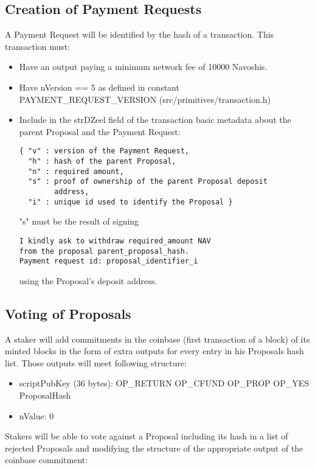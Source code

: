 \documentclass{artikel1}
\begin{document}
\begin{flushleft}
\subsection{Creation of Payment Requests}

A Payment Request will be identified by the hash of a transaction. This transaction must:

\begin{itemize}
\item Have an output paying a minimum network fee of 10000 Navoshis.
\item Have nVersion == 5 as defined in constant PAYMENT\_REQUEST\_VERSION (src/primitives/transaction.h) 
\item Include in the strDZeel field of the transaction basic metadata about the parent Proposal and the Payment Request:
\begin{lstlisting}
{ "v" : version of the Payment Request,
  "h" : hash of the parent Proposal,
  "n" : required amount,
  "s" : proof of ownership of the parent Proposal deposit
        address,
  "i" : unique id used to identify the Proposal }
\end{lstlisting}
"s" must be the result of signing
\begin{lstlisting}
I kindly ask to withdraw required_amount NAV
from the proposal parent_proposal_hash.
Payment request id: proposal_identifier_i
\end{lstlisting}

using the Proposal's deposit address.

\end{itemize}

\subsection{Voting of Proposals}

A staker will add commitments in the coinbase (first transaction of a block) of its minted blocks in the form of extra outputs for every entry in his Proposals hash list. Those outputs will meet following structure:

\begin{itemize}
\item scriptPubKey (36 bytes): OP\_RETURN OP\_CFUND OP\_PROP OP\_YES ProposalHash 
\item nValue: 0
\end{itemize}

Stakers will be able to vote against a Proposal including its hash in a list of rejected Proposals and modifying the structure of the appropriate output of the coinbase commitment:


\end{flushleft}
\end{document}
